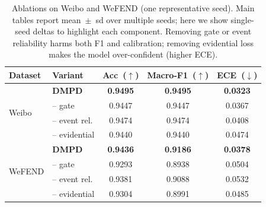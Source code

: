\begin{table}[t]
\centering
\small
\setlength{\tabcolsep}{2pt}
\begin{tabular}{@{}l l c c c@{}}
\toprule
Dataset & Variant & Acc~($\uparrow$) & Macro-F1~($\uparrow$) & ECE~($\downarrow$) \\
\midrule
\multirow{4}{*}{Weibo}
  & \textbf{DMPD}          & \textbf{0.9495} & \textbf{0.9495} & \textbf{0.0323} \\
  & \hspace{0.4em}-- gate        & 0.9447 & 0.9447 & 0.0367 \\
  & \hspace{0.4em}-- event rel.  & 0.9474 & 0.9474 & 0.0408 \\
  & \hspace{0.4em}-- evidential  & 0.9440 & 0.9440 & 0.0474 \\
\midrule
\multirow{4}{*}{WeFEND}
  & \textbf{DMPD}          & \textbf{0.9436} & \textbf{0.9186} & \textbf{0.0378} \\
  & \hspace{0.4em}-- gate        & 0.9293 & 0.8938 & 0.0504 \\
  & \hspace{0.4em}-- event rel.  & 0.9381 & 0.9088 & 0.0532 \\
  & \hspace{0.4em}-- evidential  & 0.9304 & 0.8991 & 0.0485 \\
\bottomrule
\end{tabular}
\caption[Ablations on Weibo and WeFEND]{Ablations on Weibo and WeFEND (one representative seed). Main tables report mean~$\pm$~sd over multiple seeds; here we show single-seed deltas to highlight each component. Removing gate or event reliability harms both F1 and calibration; removing evidential loss makes the model over-confident (higher ECE).}
\label{tab:abl}
\end{table}
